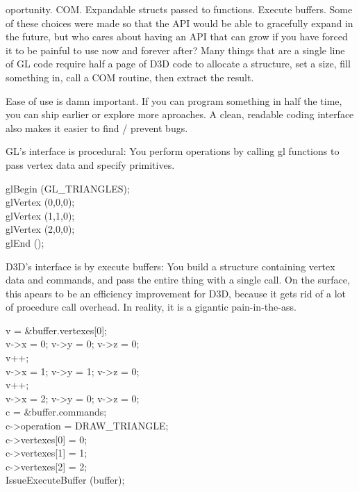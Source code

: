 \begin{allintypewriter}
oportunity. COM. Expandable structs passed to functions. Execute buffers. Some of these choices 
were made so that the API would be able to gracefully expand in the future, but who cares about 
having an API that can grow if you have forced it to be painful to use now and forever after? Many 
things that are a single line of GL code require half a page of D3D code to allocate a structure, 
set a size, fill something in, call a COM routine, then extract the result.\\ 
\par
Ease of use is damn important. If you can program something in half the time, you can ship earlier or 
explore more aproaches. A clean, readable coding interface also makes it easier to find / prevent bugs.\\ 
\par
GL's interface is procedural: You perform operations by calling gl functions to pass vertex data and 
specify primitives.\\ 
\par

glBegin (GL\_TRIANGLES);\\ 
glVertex (0,0,0);\\ 
glVertex (1,1,0);\\ 
glVertex (2,0,0);\\ 
glEnd ();\\ 

\par
D3D's interface is by execute buffers: You build a structure containing vertex data and commands, and pass 
the entire thing with a single call. On the surface, this apears to be an efficiency improvement for D3D, 
because it gets rid of a lot of procedure call overhead. In reality, it is a gigantic pain-in-the-ass.\\ 
\par

v = \&buffer.vertexes[0];\\ 
v->x = 0; v->y = 0; v->z = 0;\\ 
v++;\\ 
v->x = 1; v->y = 1; v->z = 0;\\ 
v++;\\ 
v->x = 2; v->y = 0; v->z = 0;\\ 
c = \&buffer.commands;\\ 
c->operation = DRAW\_TRIANGLE;\\ 
c->vertexes[0] = 0;\\ 
c->vertexes[1] = 1;\\ 
c->vertexes[2] = 2;\\ 
IssueExecuteBuffer (buffer);\\ 


\end{allintypewriter}
